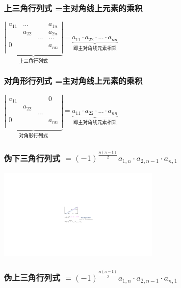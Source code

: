 \documentclass[UTF8]{ctexart}
\begin{document}
\subsubsection{上三角行列式 =主对角线上元素的乘积}

$
\underset{\text{上三角行列式}}{\underbrace{\left| \begin{matrix}
			a_{11}&		...&		&		a_{1n}\\
			&		a_{22}&		&		a_{2n}\\
			&		&		...&		...\\
			0&		&		&		a_{nn}\\
		\end{matrix} \right|}}=\underset{\text{即主对角线元素相乘}}{\underbrace{a_{11}\cdot a_{22}\cdot ...\cdot a_{nn}}}
$


\subsubsection{对角形行列式 =主对角线上元素的乘积}
$
\underset{\text{对角形行列式}}{\underbrace{\left| \begin{matrix}
			a_{11}&		&		&		0\\
			&		a_{22}&		&		\\
			&		&		...&		\\
			0&		&		&		a_{nn}\\
		\end{matrix} \right|}}=\underset{\text{即主对角线元素相乘}}{\underbrace{a_{11}\cdot a_{22}\cdot ...\cdot a_{nn}}}
$


\subsubsection{伪下三角行列式  $	=\left( -1 \right) ^{\frac{n\left( n-1 \right)}{2}}a_{1,n}\cdot a_{2,n-1}\cdot a_{n,1}	$}

\includegraphics[width=0.6\textwidth]{img/0004.pdf}\\



\subsubsection{伪上三角行列式 $	=\left( -1 \right) ^{\frac{n\left( n-1 \right)}{2}}a_{1,n}\cdot a_{2,n-1}\cdot a_{n,1}	$}
\end{document}
